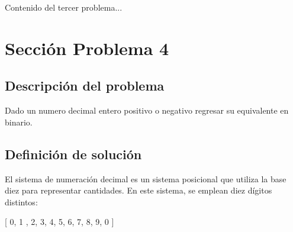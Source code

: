 \documentclass{IEEEcsmag}
\begin{document}
\newpage 
Contenido del tercer problema...
\newpage 




































































\section{Sección Problema 4}
\subsection{Descripción del problema}
Dado un numero decimal entero positivo o negativo regresar su equivalente en binario.
\newline

\subsection{Definición de solución}

El sistema de numeración decimal es un sistema posicional que utiliza la base diez para representar cantidades. En este sistema, se emplean diez dígitos distintos:
\newline

[ 0, 1 , 2, 3, 4, 5, 6, 7, 8, 9, 0 ] 
\newline
\end{document}
